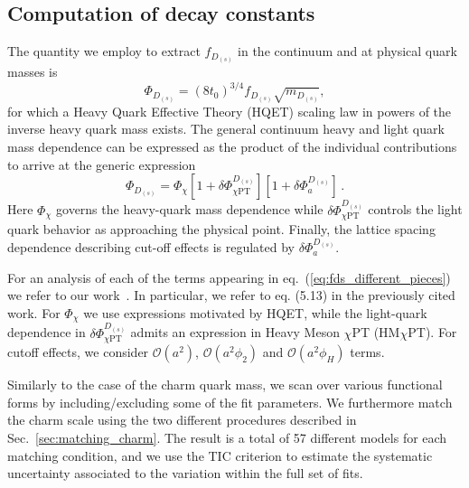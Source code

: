 \subsection{Computation of decay constants}

The quantity we employ to extract $f_{D_{(s)}}$ in the continuum and at physical quark masses is
\begin{equation}
  \Phi_{D_{(s)}} = (8t_0)^{3/4}f_{D_{(s)}} \sqrt{m_{D_{(s)}}},
  \label{eq:defphiD}
\end{equation}
for which a Heavy Quark Effective Theory (HQET) scaling law in powers of the inverse
heavy quark mass exists.
The general continuum heavy and light quark mass dependence can be expressed as the product of the individual contributions to arrive at the generic expression 
\begin{equation}
	\Phi_{D_{(s)}} = \Phi_{\chi} \left[
	1 + \delta\Phi_{\chi\mathrm{PT}}^{D_{(s)}}
	\right]
	\left[
	1 + \delta\Phi_a^{D_{(s)}}
	\right]\,.
	\label{eq:fds_different_pieces}
\end{equation}
Here $\Phi_\chi$ governs the heavy-quark mass dependence while  $\delta\Phi_{\chi\mathrm{PT}}^{D_{(s)}}$ controls the light quark behavior as approaching the physical point. Finally, the lattice spacing dependence describing cut-off effects is regulated by $\delta\Phi_a^{D_{(s)}}$. 

For an analysis of each of the terms appearing in eq.~(\ref{eq:fds_different_pieces}) we refer to our work~\citep{charm}. In particular, we refer to eq. (5.13) in the previously cited work. For $\Phi_{\chi}$ we use expressions motivated by HQET, while the light-quark dependence in $\delta\Phi_{\chi\mathrm{PT}}^{D_{(s)}}$ admits an expression in Heavy Meson $\chi$PT (HM$\chi$PT). For cutoff effects, we consider $\mathcal{O}(a^2)$, $\mathcal{O}(a^2\phi_2)$ and $\mathcal{O}(a^2\phi_H)$ terms.

Similarly to the case of the charm quark mass, we scan over various functional forms by including/excluding some of the fit parameters. We furthermore match the charm scale using
the two different procedures described in Sec.~\ref{sec:matching_charm}. The result is a total
of 57 different models  for each matching condition,
and we use the TIC criterion to estimate the systematic uncertainty associated to the variation
within the full set of fits.

